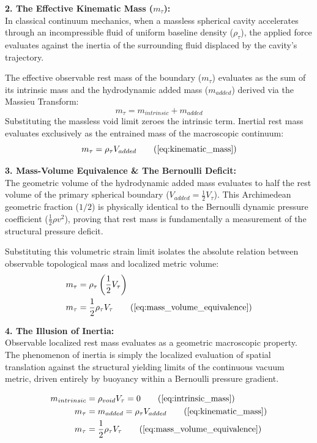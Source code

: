 \documentclass[11pt, a4paper]{article}
\begin{document}
\textbf{2. The Effective Kinematic Mass ($m_\tau$):} \\
In classical continuum mechanics, when a massless spherical cavity accelerates through an incompressible fluid of uniform baseline density ($\rho_{\tau}$), the applied force evaluates against the inertia of the surrounding fluid displaced by the cavity's trajectory. 

The effective observable rest mass of the boundary ($m_\tau$) evaluates as the sum of its intrinsic mass and the hydrodynamic added mass ($m_{added}$) derived via the Massieu Transform:
\begin{equation}
    m_\tau = m_{intrinsic} + m_{added} 
\end{equation}
Substituting the massless void limit zeroes the intrinsic term. Inertial rest mass evaluates exclusively as the entrained mass of the macroscopic continuum:
\begin{equation}
    m_\tau = \rho_{\tau} V_{added} \tag{\ref{eq:kinematic_mass}}
\end{equation}

\textbf{3. Mass-Volume Equivalence \& The Bernoulli Deficit:} \\
The geometric volume of the hydrodynamic added mass evaluates to half the rest volume of the primary spherical boundary ($V_{added} = \frac{1}{2} V_\tau$). This Archimedean geometric fraction ($1/2$) is physically identical to the Bernoulli dynamic pressure coefficient ($\frac{1}{2}\rho v^2$), proving that rest mass is fundamentally a measurement of the structural pressure deficit. 

Substituting this volumetric strain limit isolates the absolute relation between observable topological mass and localized metric volume:
\begin{align}
    m_\tau &= \rho_{\tau} \left( \frac{1}{2} V_\tau \right)  \\
    m_\tau &= \frac{1}{2} \rho_{\tau} V_\tau \tag{\ref{eq:mass_volume_equivalence}}
\end{align}

\textbf{4. The Illusion of Inertia:} \\
Observable localized rest mass evaluates as a geometric macroscopic property. The phenomenon of inertia is simply the localized evaluation of spatial translation against the structural yielding limits of the continuous vacuum metric, driven entirely by buoyancy within a Bernoulli pressure gradient.

\begin{tcolorbox}[recallbox, title={\ref{box:hydrodynamic_mass}. The Kinematic Origin of Inertia}]
\begin{align}
    m_{intrinsic} &= \rho_{void} V_\tau = 0 \tag{\ref{eq:intrinsic_mass}} \\
    m_\tau &= m_{added} = \rho_{\tau} V_{added} \tag{\ref{eq:kinematic_mass}} \\
    m_\tau &= \frac{1}{2} \rho_{\tau} V_\tau \tag{\ref{eq:mass_volume_equivalence}}
\end{align}
\end{tcolorbox}
\end{document}
